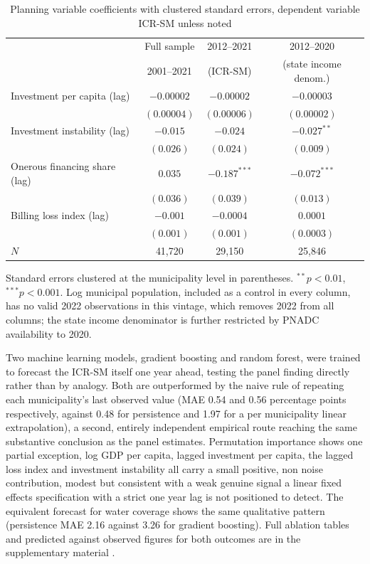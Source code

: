 \documentclass[preprint,12pt]{elsarticle}
\begin{document}
\begin{table}[h]
\caption{Planning variable coefficients with clustered standard errors, dependent variable ICR-SM unless noted}\label{tab_periodo_2012_2022}
\centering
\small
\begin{tabular}{@{}lccc@{}}
\toprule
 & Full sample & 2012--2021 & 2012--2020 \\
 & 2001--2021 & (ICR-SM) & (state income denom.) \\
\midrule
Investment per capita (lag)     & $-0.00002$ & $-0.00002$ & $-0.00003$ \\
                                 & \scriptsize$(0.00004)$ & \scriptsize$(0.00006)$ & \scriptsize$(0.00002)$ \\
Investment instability (lag)    & $-0.015$   & $-0.024$   & $-0.027^{**}$ \\
                                 & \scriptsize$(0.026)$ & \scriptsize$(0.024)$ & \scriptsize$(0.009)$ \\
Onerous financing share (lag)   & $0.035$    & $-0.187^{***}$ & $-0.072^{***}$ \\
                                 & \scriptsize$(0.036)$ & \scriptsize$(0.039)$ & \scriptsize$(0.013)$ \\
Billing loss index (lag)        & $-0.001$   & $-0.0004$  & $0.0001$ \\
                                 & \scriptsize$(0.001)$ & \scriptsize$(0.001)$ & \scriptsize$(0.0003)$ \\
\midrule
$N$              & 41,720 & 29,150 & 25,846 \\
\bottomrule
\end{tabular}
\vspace{2pt}
\footnotesize Standard errors clustered at the municipality level in parentheses. $^{**}p<0.01$, $^{***}p<0.001$. Log municipal population, included as a control in every column, has no valid 2022 observations in this vintage, which removes 2022 from all columns; the state income denominator is further restricted by PNADC availability to 2020.
\end{table}

Two machine learning models, gradient boosting and random forest, were trained to forecast the ICR-SM itself one year ahead, testing the panel finding directly rather than by analogy. Both are outperformed by the naive rule of repeating each municipality's last observed value (MAE 0.54 and 0.56 percentage points respectively, against 0.48 for persistence and 1.97 for a per municipality linear extrapolation), a second, entirely independent empirical route reaching the same substantive conclusion as the panel estimates. Permutation importance shows one partial exception, log GDP per capita, lagged investment per capita, the lagged loss index and investment instability all carry a small positive, non noise contribution, modest but consistent with a weak genuine signal a linear fixed effects specification with a strict one year lag is not positioned to detect. The equivalent forecast for water coverage shows the same qualitative pattern (persistence MAE 2.16 against 3.26 for gradient boosting). Full ablation tables and predicted against observed figures for both outcomes are in the supplementary material \citep{Figueredo2026Repo}.
\end{document}
